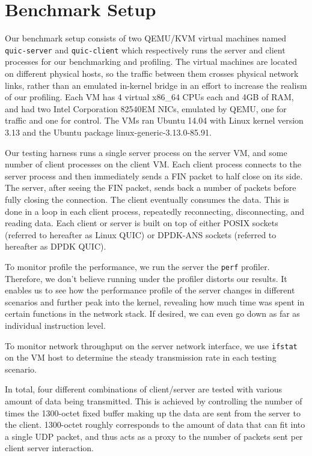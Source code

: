 \documentclass{sig-alternate-05-2015}
\begin{document}
\section{Benchmark Setup}
Our benchmark setup consists of two QEMU/KVM virtual machines named
\texttt{quic-server} and \texttt{quic-client} which respectively runs the server and client processes for our benchmarking and profiling.
The virtual machines are located on different physical hosts,
so the traffic between them crosses physical network links, rather than an emulated in-kernel bridge in an effort to increase the realism of our profiling. Each VM has 4 virtual x86\_64 CPUs each and 4GB of RAM,
and had two Intel Corporation 82540EM NICs, emulated by QEMU, one for traffic and one for control. The VMs ran Ubuntu 14.04 with Linux kernel version 3.13 and the Ubuntu package linux-generic-3.13.0-85.91.

Our testing harness runs a single server process on the server VM,
and some number of client processes on the client VM. Each client process connects to the server process and then immediately sends a FIN packet to half close on its side. The server, after seeing the FIN packet, sends back a number of packets before fully closing the connection. The client eventually consumes the data. This is done in a loop in each client process, repeatedly reconnecting, disconnecting, and reading data. Each client or server is built on top of either POSIX sockets (referred to hereafter as Linux QUIC) or DPDK-ANS sockets (referred to hereafter as DPDK QUIC). 

To monitor profile the performance, we run the server the \texttt{perf} profiler.
Therefore, we don't believe running under the profiler distorts our results. It enables us to see how the performance profile of the server changes in different scenarios and further peak into the kernel,
revealing how much time was spent in certain functions in the network stack. If desired, we can even go down as far as individual instruction level.

To monitor network throughput on the server network interface, we use \texttt{ifstat} on the VM host to determine the steady transmission rate in each testing scenario.

In total, four different combinations of client/server are tested with various amount of data being transmitted. This is achieved by controlling the number of times the 1300-octet fixed buffer making up the data are sent from the server to the client. 1300-octet roughly corresponds to the amount of data that can fit into a single UDP packet, and thus acts as a proxy to the number of packets sent per client server interaction.
\end{document}
